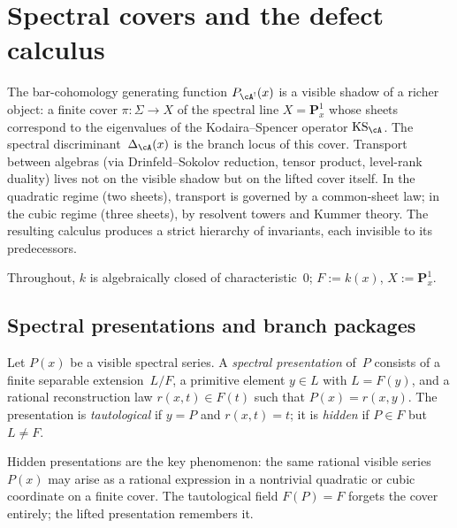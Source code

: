 \section{Spectral covers and the defect calculus}
\label{sec:spectral-covers-defect}

The bar-cohomology generating function $P_{\cA^!}(x)$ is a visible
shadow of a richer object: a finite cover $\pi \colon \Sigma \to X$
of the spectral line $X = \mathbf{P}^1_x$ whose sheets correspond to
the eigenvalues of the Kodaira--Spencer operator
$\mathrm{KS}_\cA$.  The spectral discriminant~$\Delta_\cA(x)$
is the branch locus of this cover.  Transport between algebras (via
Drinfeld--Sokolov reduction, tensor product, level-rank duality) lives
not on the visible shadow but on the lifted cover itself.  In the
quadratic regime (two sheets), transport is governed by a common-sheet
law; in the cubic regime (three sheets), by resolvent towers and
Kummer theory.  The resulting calculus produces a strict
hierarchy of invariants, each invisible to its predecessors.

Throughout, $k$ is algebraically closed of characteristic~$0$;
$F := k(x)$, $X := \mathbf{P}^1_x$.

\subsection{Spectral presentations and branch packages}
\label{subsec:spectral-presentations}

\begin{definition}
\label{def:spectral-presentation}
Let $P(x)$ be a visible spectral series.  A \emph{spectral
presentation} of~$P$ consists of a finite separable extension~$L/F$,
a primitive element $y \in L$ with $L = F(y)$, and a rational
reconstruction law $r(x,t) \in F(t)$ such that $P(x) = r(x,y)$.
The presentation is \emph{tautological} if $y = P$ and $r(x,t) = t$;
it is \emph{hidden} if $P \in F$ but $L \neq F$.
\end{definition}

Hidden presentations are the key phenomenon: the same rational visible
series~$P(x)$ may arise as a rational expression in a nontrivial
quadratic or cubic coordinate on a finite cover.  The tautological
field $F(P) = F$ forgets the cover entirely; the lifted presentation
remembers it.

